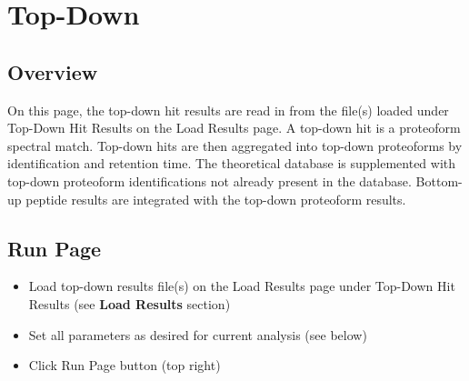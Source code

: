 
\section{Top-Down}

\subsection{Overview}
On this page, the top-down hit results are read in from the file(s) loaded under Top-Down Hit Results on the Load Results page. A top-down hit is a proteoform spectral match. Top-down hits are then aggregated into top-down  proteoforms by identification and retention time. The theoretical database is supplemented with top-down proteoform identifications not already present in the database. Bottom-up peptide results are integrated with the top-down proteoform results.

\subsection{Run Page}
\begin{itemize}
\item Load top-down results file(s) on the Load Results page under Top-Down Hit Results (see \textbf{Load Results} section)
\item Set all parameters as desired for current analysis (see below)
\item Click Run Page button (top right)
\end{itemize}

